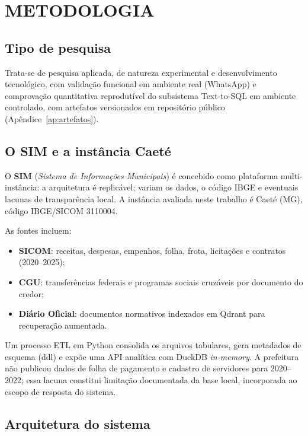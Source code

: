 \chapter{\MakeUppercase{Metodologia}}

\section{Tipo de pesquisa}

Trata-se de pesquisa aplicada, de natureza experimental e desenvolvimento tecnológico, com validação funcional em ambiente real (WhatsApp) e comprovação quantitativa reprodutível do subsistema Text-to-SQL em ambiente controlado, com artefatos versionados em repositório público (Apêndice~\ref{ap:artefatos}).

\section{O SIM e a instância Caeté}

O \textbf{SIM} (\textit{Sistema de Informações Municipais}) é concebido como plataforma multi-instância: a arquitetura é replicável; variam os dados, o código IBGE e eventuais lacunas de transparência local. A instância avaliada neste trabalho é Caeté (MG), código IBGE/SICOM 3110004.

As fontes incluem:

\begin{itemize}
    \item \textbf{SICOM}: receitas, despesas, empenhos, folha, frota, licitações e contratos (2020--2025);
    \item \textbf{CGU}: transferências federais e programas sociais cruzáveis por documento do credor;
    \item \textbf{Diário Oficial}: documentos normativos indexados em Qdrant para recuperação aumentada.
\end{itemize}

Um processo ETL em Python consolida os arquivos tabulares, gera metadados de esquema (\gls{ddl}) e expõe uma API analítica com DuckDB \textit{in-memory}. A prefeitura não publicou dados de folha de pagamento e cadastro de servidores para 2020--2022; essa lacuna constitui limitação documentada da base local, incorporada ao escopo de resposta do sistema.

\section{Arquitetura do sistema}

